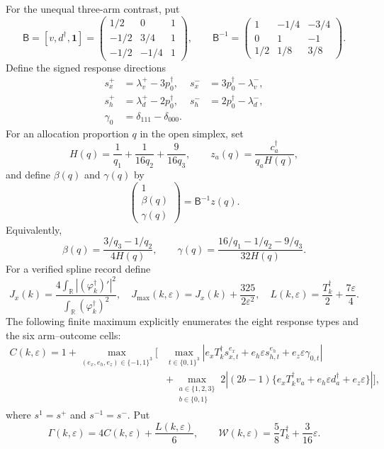 For the unequal three-arm contrast, put
\[
\mathsf B=[v,d^\dagger,\mathbf 1]
=\begin{pmatrix}
1/2&0&1\\
-1/2&3/4&1\\
-1/2&-1/4&1
\end{pmatrix},
\qquad
\mathsf B^{-1}=
\begin{pmatrix}
1&-1/4&-3/4\\
0&1&-1\\
1/2&1/8&3/8
\end{pmatrix}.
\]
Define the signed response directions
\[
\begin{aligned}
s_x^+&=\lambda_v^+-3p_0^\dagger,&
s_x^-&=3p_0^\dagger-\lambda_v^-,\\
s_h^+&=\lambda_d^+-2p_0^\dagger,&
s_h^-&=2p_0^\dagger-\lambda_d^-,\\
\gamma_0&=\delta_{111}-\delta_{000}.
\end{aligned}
\]
For an allocation proportion \(q\) in the open simplex, set
\[
H(q)=\frac1{q_1}+\frac1{16q_2}+\frac9{16q_3},
\qquad
z_a(q)=\frac{c_a^\dagger}{q_aH(q)},
\]
and define \(\beta(q)\) and \(\gamma(q)\) by
\[
\begin{pmatrix}1\\ \beta(q)\\ \gamma(q)\end{pmatrix}
=\mathsf B^{-1}z(q).
\]
Equivalently,
\[
\beta(q)=\frac{3/q_3-1/q_2}{4H(q)},
\qquad
\gamma(q)=\frac{16/q_1-1/q_2-9/q_3}{32H(q)}.
\]
For a verified spline record define
\[
J_x(k)=\frac{4\int_{\mathbb R}|(\varphi_k^\dagger)'|^2}
{\int_{\mathbb R}(\varphi_k^\dagger)^2},
\quad
J_{\max}(k,\varepsilon)=J_x(k)+\frac{325}{2\varepsilon^2},
\quad
L(k,\varepsilon)=\frac{T_k^\dagger}{2}+\frac{7\varepsilon}{4}.
\]
The following finite maximum explicitly enumerates the eight response types and the six arm--outcome cells:
\[
\begin{aligned}
C(k,\varepsilon)=1+
\max_{(e_x,e_h,e_z)\in\{-1,1\}^3}
\Bigg[&\max_{t\in\{0,1\}^3}
\left|e_xT_k^\dagger s_{x,t}^{e_x}
+e_h\varepsilon s_{h,t}^{e_h}
+e_z\varepsilon\gamma_{0,t}\right|\\
&+\max_{\substack{a\in\{1,2,3\}\\ b\in\{0,1\}}}
2\left|(2b-1)
\{e_xT_k^\dagger v_a+e_h\varepsilon d_a^\dagger
+e_z\varepsilon\}\right|\Bigg],
\end{aligned}
\]
where \(s^1=s^+\) and \(s^{-1}=s^-\).  Put
\[
\Gamma(k,\varepsilon)=4C(k,\varepsilon)+\frac{L(k,\varepsilon)}6,
\qquad
\mathcal W(k,\varepsilon)=\frac58T_k^\dagger+\frac3{16}\varepsilon.
\]
